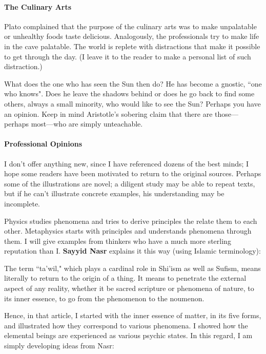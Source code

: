 \paragraph{The Culinary Arts}
Plato complained that the purpose of the culinary arts was to make unpalatable or unhealthy foods taste delicious. Analogously, the professionals try to make life in the cave palatable. The world is replete with distractions that make it possible to get through the day. (I leave it to the reader to make a personal list of such distraction.)

What does the one who has seen the Sun then do? He has become a gnostic, ``one who knows". Does he leave the shadows behind or does he go back to find some others, always a small minority, who would like to see the Sun? Perhaps you have an opinion. Keep in mind Aristotle's sobering claim that there are those—perhaps most—who are simply unteachable.

\paragraph{Professional Opinions}
I don't offer anything new, since I have referenced dozens of the best minds; I hope some readers have been motivated to return to the original sources. Perhaps some of the illustrations are novel; a diligent study may be able to repeat texts, but if he can't illustrate concrete examples, his understanding may be incomplete.

Physics studies phenomena and tries to derive principles the relate them to each other. Metaphysics starts with principles and understands phenomena through them. I will give examples from thinkers who have a much more sterling reputation than I. \textbf{Sayyid Nasr} explains it this way (using Islamic terminology):

\begin{quotex}
The term ``ta'wil," which plays a cardinal role in Shi'ism as well as Sufism, means literally to return to the origin of a thing. It means to penetrate the external aspect of any reality, whether it be sacred scripture or phenomena of nature, to its inner essence, to go from the phenomenon to the noumenon.

\end{quotex}
Hence, in that article, I started with the inner essence of matter, in its five forms, and illustrated how they correspond to various phenomena. I showed how the elemental beings are experienced as various psychic states. In this regard, I am simply developing ideas from Nasr:

